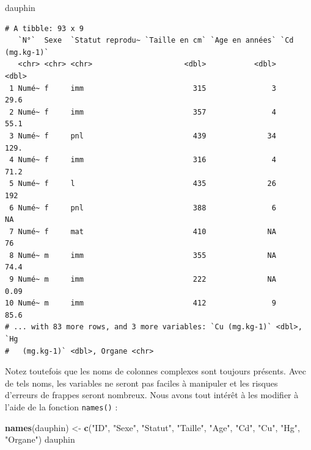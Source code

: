 \documentclass[a4paperpaper,]{article}
\newenvironment{Shaded}{\begin{snugshade}}{\end{snugshade}}
\newcommand{\KeywordTok}[1]{\textcolor[rgb]{0.13,0.29,0.53}{\textbf{#1}}}
\newcommand{\StringTok}[1]{\textcolor[rgb]{0.31,0.60,0.02}{#1}}
\newcommand{\NormalTok}[1]{#1}
\theoremstyle{definition}
\theoremstyle{definition}
\theoremstyle{definition}
\theoremstyle{remark}
\begin{document}
\begin{Shaded}
\begin{Highlighting}[]
\NormalTok{dauphin}
\end{Highlighting}
\end{Shaded}

\begin{verbatim}
# A tibble: 93 x 9
   `N°`  Sexe  `Statut reprodu~ `Taille en cm` `Age en années` `Cd (mg.kg-1)`
   <chr> <chr> <chr>                     <dbl>           <dbl>          <dbl>
 1 Numé~ f     imm                         315               3          29.6 
 2 Numé~ f     imm                         357               4          55.1 
 3 Numé~ f     pnl                         439              34         129.  
 4 Numé~ f     imm                         316               4          71.2 
 5 Numé~ f     l                           435              26         192   
 6 Numé~ f     pnl                         388               6          NA   
 7 Numé~ f     mat                         410              NA          76   
 8 Numé~ m     imm                         355              NA          74.4 
 9 Numé~ m     imm                         222              NA           0.09
10 Numé~ m     imm                         412               9          85.6 
# ... with 83 more rows, and 3 more variables: `Cu (mg.kg-1)` <dbl>, `Hg
#   (mg.kg-1)` <dbl>, Organe <chr>
\end{verbatim}

Notez toutefois que les noms de colonnes complexes sont toujours
présents. Avec de tels noms, les variables ne seront pas faciles à
manipuler et les risques d'erreurs de frappes seront nombreux. Nous
avons tout intérêt à les modifier à l'aide de la fonction
\texttt{names()} :

\begin{Shaded}
\begin{Highlighting}[]
\KeywordTok{names}\NormalTok{(dauphin) <-}\StringTok{ }\KeywordTok{c}\NormalTok{(}\StringTok{"ID"}\NormalTok{, }\StringTok{"Sexe"}\NormalTok{, }\StringTok{"Statut"}\NormalTok{, }\StringTok{"Taille"}\NormalTok{, }\StringTok{"Age"}\NormalTok{, }\StringTok{"Cd"}\NormalTok{, }\StringTok{"Cu"}\NormalTok{, }\StringTok{"Hg"}\NormalTok{, }\StringTok{"Organe"}\NormalTok{)}
\NormalTok{dauphin}
\end{Highlighting}
\end{Shaded}
\end{document}
